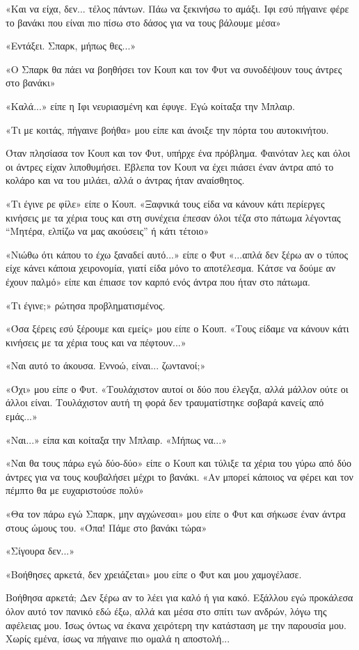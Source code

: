 \documentclass[12pt,twoside, openany]{book}
\begin{document}
«Και να είχα, δεν... τέλος πάντων. Πάω να ξεκινήσω το αμάξι. Ιφι εσύ πήγαινε φέρε το βανάκι που είναι πιο πίσω στο δάσος για να τους βάλουμε μέσα»

«Εντάξει. Σπαρκ, μήπως θες...»

«Ο Σπαρκ θα πάει να βοηθήσει τον Κουπ και τον Φυτ να συνοδέψουν τους άντρες στο βανάκι»

«Καλά...» είπε η Ιφι νευριασμένη και έφυγε. Εγώ κοίταξα την Μπλαιρ.

«Τι με κοιτάς, πήγαινε βοήθα» μου είπε και άνοιξε την πόρτα του αυτοκινήτου.

Όταν πλησίασα τον Κουπ και τον Φυτ, υπήρχε ένα πρόβλημα. Φαινόταν λες και όλοι οι άντρες είχαν λιποθυμήσει. Έβλεπα τον Κουπ να έχει πιάσει έναν άντρα από το κολάρο και να του μιλάει, αλλά ο άντρας ήταν αναίσθητος.

«Τι έγινε ρε φίλε» είπε ο Κουπ. «Ξαφνικά τους είδα να κάνουν κάτι περίεργες κινήσεις με τα χέρια τους και στη συνέχεια έπεσαν όλοι τέζα στο πάτωμα λέγοντας “Μητέρα, ελπίζω να μας ακούσεις” ή κάτι τέτοιο»

«Νιώθω ότι κάπου το έχω ξαναδεί αυτό...» είπε ο Φυτ «...απλά δεν ξέρω αν ο τύπος είχε κάνει κάποια χειρονομία, γιατί είδα μόνο το αποτέλεσμα. Κάτσε να δούμε αν έχουν παλμό» είπε και έπιασε τον καρπό ενός άντρα που ήταν στο πάτωμα.

«Τι έγινε;» ρώτησα προβληματισμένος.

«Όσα ξέρεις εσύ ξέρουμε και εμείς» μου είπε ο Κουπ. «Τους είδαμε να κάνουν κάτι κινήσεις με τα χέρια τους και να πέφτουν...»

«Ναι αυτό το άκουσα. Εννοώ, είναι... ζωντανοί;»

«Όχι» μου είπε ο Φυτ. «Τουλάχιστον αυτοί οι δύο που έλεγξα, αλλά μάλλον ούτε οι άλλοι είναι. Τουλάχιστον αυτή τη φορά δεν τραυματίστηκε σοβαρά κανείς από εμάς...»

«Ναι...» είπα και κοίταξα την Μπλαιρ. «Μήπως να...»

«Ναι θα τους πάρω εγώ δύο-δύο» είπε ο Κουπ και τύλιξε τα χέρια του γύρω από δύο άντρες για να τους κουβαλήσει μέχρι το βανάκι. «Αν μπορεί κάποιος να φέρει και τον πέμπτο θα με ευχαριστούσε πολύ»

«Θα τον πάρω εγώ Σπαρκ, μην αγχώνεσαι» μου είπε ο Φυτ και σήκωσε έναν άντρα στους ώμους του. «Όπα! Πάμε στο βανάκι τώρα»

«Σίγουρα δεν...»

«Βοήθησες αρκετά, δεν χρειάζεται» μου είπε ο Φυτ και μου χαμογέλασε.

Βοήθησα αρκετά; Δεν ξέρω αν το λέει για καλό ή για κακό. Εξάλλου εγώ προκάλεσα όλον αυτό τον πανικό εδώ έξω, αλλά και μέσα στο σπίτι των ανδρών, λόγω της αφέλειας μου. Ίσως όντως να έκανα χειρότερη την κατάσταση με την παρουσία μου. Χωρίς εμένα, ίσως να πήγαινε πιο ομαλά η αποστολή...
\end{document}
